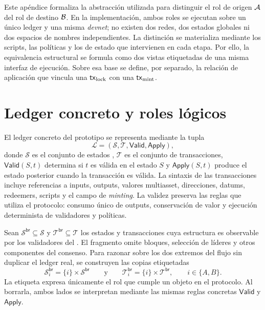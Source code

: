 
Este apéndice formaliza la abstracción utilizada para distinguir el rol de origen $\mathcal{A}$ del rol de destino $\mathcal{B}$. En la implementación, ambos roles se ejecutan sobre un único ledger \eUTxO y una misma \textit{devnet}; no existen dos redes, dos estados globales ni dos espacios de nombres independientes. La distinción se materializa mediante los scripts, las políticas y los \UTxOs de estado que intervienen en cada etapa. Por ello, la equivalencia estructural se formula como dos vistas etiquetadas de una misma interfaz de ejecución. Sobre esa base se define, por separado, la relación de aplicación que vincula una $\mathsf{tx}_{\mathrm{lock}}$ con una $\mathsf{tx}_{\mathrm{mint}}$.

\section{Ledger concreto y roles lógicos}
\label{sec:modelo-cadenas-instancias-logicas-del-ledger}

\begin{definition}
\label{def:ledger-eutxo-compatible-cardano}
\normalfont
El ledger concreto del prototipo se representa mediante la tupla
$$\mathcal{L}= (\mathcal{S},\mathcal{T}, \mathsf{Valid},\mathsf{Apply}),$$
donde $\mathcal{S}$ es el conjunto de estados \eUTxO, $\mathcal{T}$ es el conjunto de transacciones, $\mathsf{Valid}(S,t)$ determina si $t$ es válida en el estado $S$ y $\mathsf{Apply}(S,t)$ produce el estado posterior cuando la transacción es válida. La sintaxis de las transacciones incluye referencias a inputs, outputs, valores multiasset, direcciones, datums, redeemers, scripts y el campo de \textit{minting}. La validez preserva las reglas que utiliza el protocolo: consumo único de outputs, conservación de valor y ejecución determinista de validadores y políticas.
\end{definition}

Sean $\mathcal{S}^{\mathsf{br}}\subseteq\mathcal{S}$ y $\mathcal{T}^{\mathsf{br}}\subseteq\mathcal{T}$ los estados y transacciones cuya estructura es observable por los validadores del \Bridge. El fragmento omite bloques, selección de líderes y otros componentes del consenso. Para razonar sobre los dos extremos del flujo sin duplicar el ledger real, se construyen las copias etiquetadas
$$
\mathcal{S}^{\mathsf{br}}_i=\{i\}\times\mathcal{S}^{\mathsf{br}}
\qquad\text{y}\qquad
\mathcal{T}^{\mathsf{br}}_i=\{i\}\times\mathcal{T}^{\mathsf{br}},
\qquad i\in\{A,B\}.
$$
La etiqueta expresa únicamente el rol que cumple un objeto en el protocolo. Al borrarla, ambos lados se interpretan mediante las mismas reglas concretas $\mathsf{Valid}$ y $\mathsf{Apply}$.

